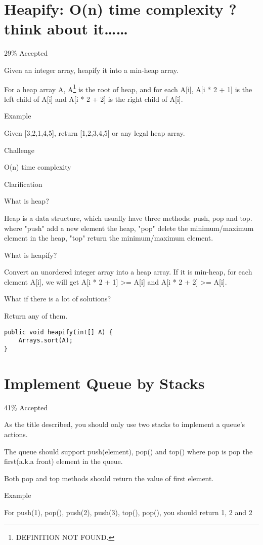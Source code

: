 \documentclass[9pt, b5paaper]{book}
\begin{document}
\section{Heapify: O(n) time complexity ? think about it\ldots{}\ldots{}}
\label{sec-1-32}

29\% Accepted

Given an integer array, heapify it into a min-heap array.

For a heap array A, A\footnote{DEFINITION NOT FOUND.} is the root of heap, and for each A[i], A[i * 2 + 1] is the left child of A[i] and A[i * 2 + 2] is the right child of A[i].

Example

Given [3,2,1,4,5], return [1,2,3,4,5] or any legal heap array.

Challenge

O(n) time complexity

Clarification

What is heap?

Heap is a data structure, which usually have three methods: push, pop and top. where "push" add a new element the heap, "pop" delete the minimum/maximum element in the heap, "top" return the minimum/maximum element.

What is heapify?

Convert an unordered integer array into a heap array. If it is min-heap, for each element A[i], we will get A[i * 2 + 1] >= A[i] and A[i * 2 + 2] >= A[i].

What if there is a lot of solutions?

Return any of them.
\begin{verbatim}
public void heapify(int[] A) {
    Arrays.sort(A);
}
\end{verbatim}
\section{Implement Queue by Stacks}
\label{sec-1-33}

41\% Accepted

As the title described, you should only use two stacks to implement a queue's actions.

The queue should support push(element), pop() and top() where pop is pop the first(a.k.a front) element in the queue.

Both pop and top methods should return the value of first element.

Example

For push(1), pop(), push(2), push(3), top(), pop(), you should return 1, 2 and 2
\end{document}
